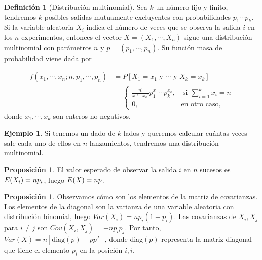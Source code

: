 \documentclass[10pt,a4paper]{article} %
\let\mathbb\relax
\theoremstyle{definition}
\newtheorem{definition}{Definición}[section]
\newtheorem{proposition}[theorem]{Proposición}
\newtheorem{example}[theorem]{Ejemplo}
\begin{document}
\begin{definition}[Distribución multinomial]
  Sea $k$ un número fijo y finito, tendremos $k$ posibles salidas mutuamente excluyentes con probabilidades $p_1\cdots p_k$. Si la variable aleatoria $X_i$ indica el número de veces que se observa la salida $i$ en los $n$ experimentos, entonces el vector $X = (X_1, \cdots, X_n)$ sigue una distribución multinomial con parámetros $n$ y $p = (p_1,\cdots, p_n)$. Su función masa de probabilidad viene dada por

\begin{align*}
f(x_1,\cdots,x_n; n, p_1,\cdots,p_n) &= P[X_1 = x_1\text{ y } \cdots \text{ y } X_k = x_k]\\ &=
\begin{cases}
    \frac{n!}{x_1!\cdots x_k!} p_1^{x_1} \cdots  p_k^{x_k},\quad\text{si } \sum_{i=1}^kx_i = n\\
    0, \qquad \qquad \qquad\text{en otro caso,}
\end{cases}
\end{align*}
donde $x_1,\cdots, x_k$ son enteros no negativos.
\end{definition}


\begin{example}
  Si tenemos un dado de $k$ lados y queremos calcular cuántas veces sale cada uno de ellos en $n$ lanzamientos, tendremos una distribución multinomial.
\end{example}

\begin{proposition}
  El valor esperado de observar la salida $i$ en $n$ sucesos es $\mathbb{E}(X_i) = np_i$, luego $\mathbb{E}(X) = np$.
\end{proposition}

\begin{proposition}
  Observamos cómo son los elementos de la matriz de covarianzas. Los elementos de la diagonal son la varianza de una variable aleatoria con distribución binomial, luego $Var(X_i) = np_i(1-p_i)$. Las covarianzas de $X_i, X_j$ para $i\neq j$ son $Cov(X_i, X_j) = - n p_i p_j$. Por tanto, $Var(X) = n [\text{diag}(p) - p p^T]$, donde diag$(p)$ representa la matriz diagonal que tiene el elemento $p_i$ en la posición $i,i$.
\end{proposition}
\end{document}
